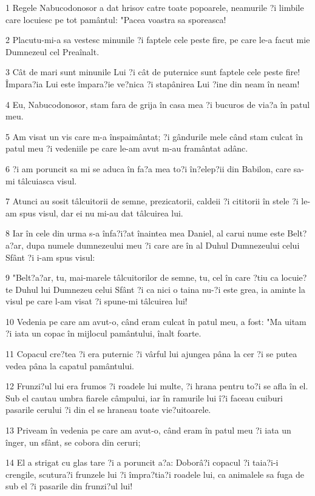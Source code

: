 \par 1 Regele Nabucodonosor a dat hrisov catre toate popoarele, neamurile ?i limbile care locuiesc pe tot pamântul: "Pacea voastra sa sporeasca!
\par 2 Placutu-mi-a sa vestesc minunile ?i faptele cele peste fire, pe care le-a facut mie Dumnezeul cel Preaînalt.
\par 3 Cât de mari sunt minunile Lui ?i cât de puternice sunt faptele cele peste fire! Împara?ia Lui este împara?ie ve?nica ?i stapânirea Lui ?ine din neam în neam!
\par 4 Eu, Nabucodonosor, stam fara de grija în casa mea ?i bucuros de via?a în patul meu.
\par 5 Am visat un vis care m-a înspaimântat; ?i gândurile mele când stam culcat în patul meu ?i vedeniile pe care le-am avut m-au framântat adânc.
\par 6 ?i am poruncit sa mi se aduca în fa?a mea to?i în?elep?ii din Babilon, care sa-mi tâlcuiasca visul.
\par 7 Atunci au sosit tâlcuitorii de semne, prezicatorii, caldeii ?i cititorii în stele ?i le-am spus visul, dar ei nu mi-au dat tâlcuirea lui.
\par 8 Iar în cele din urma s-a înfa?i?at înaintea mea Daniel, al carui nume este Belt?a?ar, dupa numele dumnezeului meu ?i care are în al Duhul Dumnezeului celui Sfânt ?i i-am spus visul:
\par 9 "Belt?a?ar, tu, mai-marele tâlcuitorilor de semne, tu, cel în care ?tiu ca locuie?te Duhul lui Dumnezeu celui Sfânt ?i ca nici o taina nu-?i este grea, ia aminte la visul pe care l-am visat ?i spune-mi tâlcuirea lui!
\par 10 Vedenia pe care am avut-o, când eram culcat în patul meu, a fost: "Ma uitam ?i iata un copac în mijlocul pamântului, înalt foarte.
\par 11 Copacul cre?tea ?i era puternic ?i vârful lui ajungea pâna la cer ?i se putea vedea pâna la capatul pamântului.
\par 12 Frunzi?ul lui era frumos ?i roadele lui multe, ?i hrana pentru to?i se afla în el. Sub el cautau umbra fiarele câmpului, iar în ramurile lui î?i faceau cuiburi pasarile cerului ?i din el se hraneau toate vie?uitoarele.
\par 13 Priveam în vedenia pe care am avut-o, când eram în patul meu ?i iata un înger, un sfânt, se cobora din ceruri;
\par 14 El a strigat cu glas tare ?i a poruncit a?a: Doborâ?i copacul ?i taia?i-i crengile, scutura?i frunzele lui ?i împra?tia?i roadele lui, ca animalele sa fuga de sub el ?i pasarile din frunzi?ul lui!
